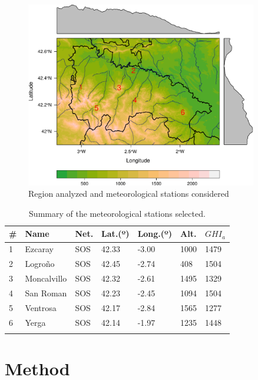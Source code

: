 \documentclass[11pt, english]{article}
\begin{document}
\begin{figure}[H]
\centering
\includegraphics[width=0.9\textwidth]{mapstations.pdf}
\caption{Region analyzed and meteorological stations considered}
\label{fig:mapstations}
\end{figure}

\begin{small}
\begin{longtable}{p{}p{}p{}p{}p{}p{}p{}}
\toprule
\# & Name & Net. & Lat.(º) & Long.(º) & Alt. & $GHI_{a}$\\
\midrule
\endhead
1 & Ezcaray & SOS & 42.33 & -3.00 & 1000 & 1479\\
\midrule
2 & Logroño & SOS & 42.45 & -2.74 & 408 & 1504\\
\midrule 
3 & Moncalvillo & SOS & 42.32 & -2.61 & 1495 & 1329 \\
\midrule
4 & San Roman & SOS & 42.23 & -2.45 & 1094 & 1504 \\
\midrule
5 & Ventrosa & SOS & 42.17 & -2.84 & 1565 & 1277\\
\midrule
6 & Yerga & SOS& 42.14 & -1.97 & 1235 &1448\\
\bottomrule
\caption{Summary of the meteorological
stations selected.}
\label{tab:stations}
\end{longtable}
\end{small}


\section{Method}
\label{sec:method}
\end{document}
